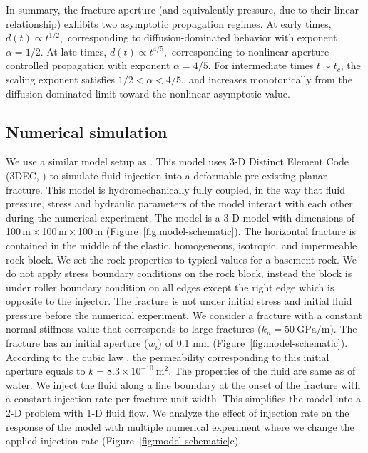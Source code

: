 \documentclass[draft]{agujournal2019}
\begin{document}
In summary, the fracture aperture (and equivalently pressure, due to their linear relationship) exhibits two asymptotic propagation regimes. At early times, $d(t) \propto t^{1/2},$ corresponding to diffusion-dominated behavior with exponent $\alpha = 1/2$. At late times, $d(t) \propto t^{4/5},$ corresponding to nonlinear aperture-controlled propagation with exponent $\alpha = 4/5$. For intermediate times $t \sim t_c$, the scaling exponent satisfies $1/2 < \alpha < 4/5,$ and increases monotonically from the diffusion-dominated limit toward the nonlinear asymptotic value.

\subsection{Numerical simulation}

We use a similar model setup as . This model uses 3-D Distinct Element Code (3DEC, ) to simulate fluid injection into a deformable pre-existing planar fracture. This model is hydromechanically fully coupled, in the way that fluid pressure, stress and hydraulic parameters of the model interact with each other during the numerical experiment.  The model is a 3-D model with dimensions of 100\,m\,×\,100\,m\,×\,100\,m (Figure~\ref{fig:model-schematic}). The horizontal fracture is contained in the middle of the elastic, homogeneous, isotropic, and impermeable rock block. We set the rock properties to typical values for a basement rock. We do not apply stress boundary conditions on the rock block, instead the block is under roller boundary condition on all edges except the right edge which is opposite to the injector. The fracture is not under initial stress and initial fluid pressure before the numerical experiment. We consider a fracture with a constant normal stiffness value that corresponds to large fractures ($k_{n}=50~\mathrm{GPa/m}$). The fracture has an initial aperture ($w_{i}$) of 0.1 mm (Figure~\ref{fig:model-schematic}). According to the cubic law \cite{WitherspoonEtAl1980}, the permeability corresponding to this initial aperture equals to $k=8.3 \times  10^{-10}~\mathrm{m^2}$. The properties of the fluid are same as of water. We inject the fluid along a line boundary at the onset of the fracture with a constant injection rate per fracture unit width. This simplifies the model into a 2-D problem with 1-D fluid flow. We analyze the effect of injection rate on the response of the model with multiple numerical experiment where we change the applied injection rate (Figure~\ref{fig:model-schematic}c).
\end{document}
